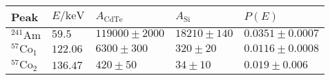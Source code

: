	\begin{tabular}{|p{2cm}|p{2.5cm}|p{3cm}|p{3cm}|p{3cm}|}
		\hline
		\rowcolor{tabcolor}
		Peak & $E / \mathrm{keV} $  & $A_\mathrm{CdTe}$ & $A_\mathrm{Si}$ & $P(E)$\\ 
		\hline
		$^{241}\mathrm{Am}$ & $59.5$ & $119000 \pm 2000$ & $18210 \pm 140$ & $0.0351 \pm 0.0007$\\ 
		$^{57}\mathrm{Co}_1$ & $122.06$ & $6300 \pm 300$ & $320 \pm 20$ & $0.0116 \pm 0.0008$\\ 
		$^{57}\mathrm{Co}_2$ & $136.47$ & $420 \pm 50$ & $34 \pm 10$ & $0.019 \pm 0.006$\\ 
		\hline
	\end{tabular}
